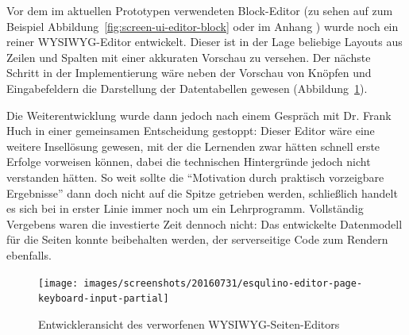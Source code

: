 Vor dem im aktuellen Prototypen verwendeten Block-Editor (zu sehen auf zum Beispiel Abbildung~\ref{fig:screen-ui-editor-block} oder im Anhang ) wurde noch ein reiner WYSIWYG-Editor entwickelt. Dieser ist in der Lage beliebige Layouts aus Zeilen und Spalten mit einer akkuraten Vorschau zu versehen. Der nächste Schritt in der Implementierung wäre neben der Vorschau von Knöpfen und Eingabefeldern die Darstellung der Datentabellen gewesen (Abbildung~\ref{fig:discarded-wysiwyg-page-editor}).

Die Weiterentwicklung wurde dann jedoch nach einem Gespräch mit Dr. Frank Huch in einer gemeinsamen Entscheidung gestoppt: Dieser Editor wäre eine weitere Insellösung gewesen, mit der die Lernenden zwar hätten schnell erste Erfolge vorweisen können, dabei die technischen Hintergründe jedoch nicht verstanden hätten. So weit sollte die "`Motivation durch praktisch vorzeigbare Ergebnisse"' dann doch nicht auf die Spitze getrieben werden, schließlich handelt es sich bei \idename{} in erster Linie immer noch um ein Lehrprogramm. Vollständig Vergebens waren die investierte Zeit dennoch nicht: Das entwickelte Datenmodell für die Seiten konnte beibehalten werden, der serverseitige Code zum Rendern ebenfalls.

\begin{figure}[p]
  \centering \texttt{[image: images/screenshots/20160731/esqulino-editor-page-keyboard-input-partial]}
  \caption{Entwickleransicht des verworfenen WYSIWYG-Seiten-Editors}
  \label{fig:discarded-wysiwyg-page-editor}
\end{figure}

